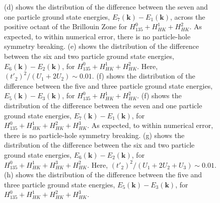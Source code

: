 \documentclass[prb,aps,amssymb,twocolumn,notitlepage]{revtex4-2}
\begin{document}
\begin{figure}
{(d) shows the distribution of the difference between the seven and one particle ground state energies, $E_{7}(\mathbf{k})-E_{1}(\mathbf{k})$, across the positive octant of the Brillouin Zone for $H^{0}_{135}+H^{1}_{HK}+H^{2}_{HK}$. 
As expected, to within numerical error, there is no particle-hole symmetry breaking.
(e) shows the distribution of the difference between the six and two particle ground state energies, $E_{6}(\mathbf{k})-E_{2}(\mathbf{k})$, for $H^{0}_{135}+H^{1}_{HK}+H^{2}_{HK}$. 
Here, $(t'_{2})^2/(U_{1}+2U_{2})\sim 0.01$.
(f) shows the distribution of the difference between the five and three particle ground state energies, $E_{5}(\mathbf{k})-E_{3}(\mathbf{k})$, for $H^{0}_{135}+H^{1}_{HK}+H^{2}_{HK}$. 
(f) shows the distribution of the difference between the seven and one particle ground state energies, $E_{7}(\mathbf{k})-E_{1}(\mathbf{k})$, for $H^{0}_{135}+H^{1}_{HK}+H^{2}_{HK}+H^{3}_{HK}$. 
As expected, to within numerical error, there is no particle-hole symmetry breaking.
(g) shows the distribution of the difference between the six and two particle ground state energies, $E_{6}(\mathbf{k})-E_{2}(\mathbf{k})$, for $H^{0}_{135}+H^{1}_{HK}+H^{3}_{HK}+H^{2}_{HK}$. 
Here, $(t'_{2})^2/(U_{1}+2U_{2}+U_{3})\sim 0.01$.
(h) shows the distribution of the difference between the five and three particle ground state energies, $E_{5}(\mathbf{k})-E_{3}(\mathbf{k})$, for $H^{0}_{135}+H^{1}_{HK}+H^{2}_{HK}+H^{3}_{HK}$. 
}
\label{fig:ParticleHoleBrillouinZone135}
\end{figure}
\end{document}
